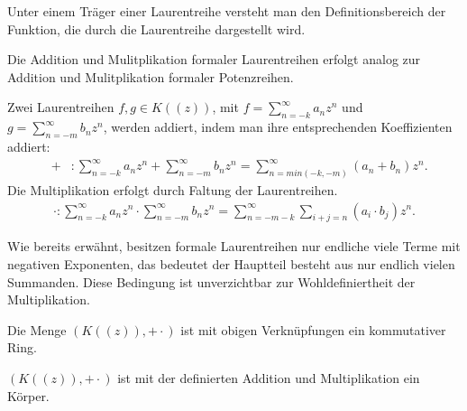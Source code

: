 %
%
%
%
\begin{bem}
Unter einem Träger einer Laurentreihe versteht man den Definitionsbereich der Funktion, die durch die Laurentreihe dargestellt wird.
\end{bem}
%
%
%
%
Die Addition und Mulitplikation formaler Laurentreihen erfolgt analog zur Addition und Mulitplikation formaler Potenzreihen.
\begin{defn}
Zwei Laurentreihen $f, g \in K((z))$, mit $f = \sum_{n=-k}^\infty a_n z^n$ und $g= \sum_{n=-m}^\infty b_n z^n$, werden addiert, indem man ihre entsprechenden Koeffizienten addiert: 
%
\begin{eqnarray*}
&+& \colon \sum_{n=-k}^\infty a_n z^n  +  \sum_{n=-m}^\infty b_n z^n = \sum_{n = min(-k, -m)}^{\infty}(a_n + b_n) z^n.
\end{eqnarray*}
%
%
Die Multiplikation erfolgt durch Faltung der Laurentreihen.
\begin{eqnarray*}
\cdot \colon \sum_{n=-k}^{\infty} a_n z^n  \cdot  \sum_{n=-m}^{\infty} b_n z^n = \sum_{n = -m-k}^{\infty}\sum_{i+j=n}^{}\left(a_i \cdot b_j\right) z^n. 
\end{eqnarray*}
%

\end{defn}
%
\begin{bem}
Wie bereits erwähnt, besitzen formale Laurentreihen nur endliche viele Terme mit negativen Exponenten, das bedeutet der Hauptteil besteht aus nur endlich vielen Summanden. Diese Bedingung ist unverzichtbar zur Wohldefiniertheit der Multiplikation. 
\end{bem}
%
%
%
%
%
\begin{satz}
Die Menge $\left(K((z)), + \cdot\right)$ ist mit obigen Verknüpfungen ein kommutativer Ring.
\end{satz}
%
\begin{satz}\label{Laurentreihenkoerper} %
$\left(K((z)), + \cdot\right)$ ist mit der definierten Addition und Multiplikation ein Körper. 
\end{satz}

